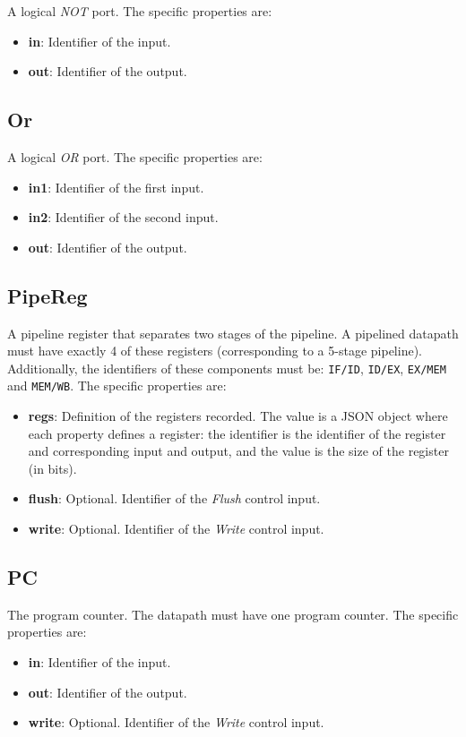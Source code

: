 \documentclass[11pt,a4paper,twoside,titlepage]{report}
\begin{document}
A logical \textit{NOT} port. The specific properties are:
\begin{itemize}
	\item \textbf{in}: Identifier of the input.
	\item \textbf{out}: Identifier of the output.
\end{itemize}

\subsection{Or}

A logical \textit{OR} port. The specific properties are:
\begin{itemize}
	\item \textbf{in1}: Identifier of the first input.
	\item \textbf{in2}: Identifier of the second input.
	\item \textbf{out}: Identifier of the output.
\end{itemize}

\subsection{PipeReg}

A pipeline register that separates two stages of the pipeline.
A pipelined datapath must have exactly 4 of these registers (corresponding to a
5-stage pipeline). Additionally, the identifiers of these components must be:
\verb+IF/ID+, \verb+ID/EX+, \verb+EX/MEM+ and \verb+MEM/WB+.
The specific properties are:
\begin{itemize}
	\item \textbf{regs}: Definition of the registers recorded. The value is a
		JSON object where each property defines a register: the identifier is
		the identifier of the register and corresponding input and output, and
		the value is the size of the register (in bits).
	\item \textbf{flush}: Optional. Identifier of the \textit{Flush} control input.
	\item \textbf{write}: Optional. Identifier of the \textit{Write} control input.
\end{itemize}

\subsection{PC}

The program counter. The datapath must have one program counter.
The specific properties are:
\begin{itemize}
	\item \textbf{in}: Identifier of the input.
	\item \textbf{out}: Identifier of the output.
	\item \textbf{write}: Optional. Identifier of the \textit{Write} control input.
\end{itemize}
\end{document}
